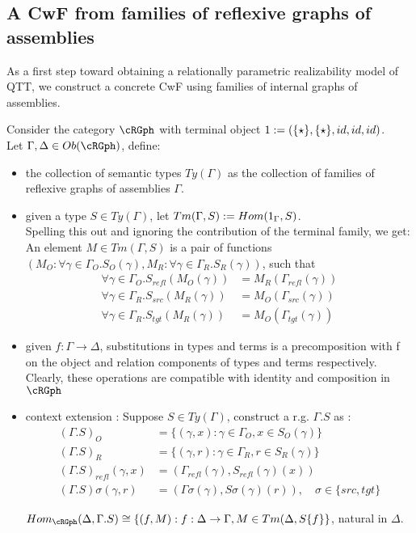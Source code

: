 \documentclass[12pt,a4paper]{article}
\def\src{_{src}}\alwaysmath{src}
\def\rfl{_{refl}}\alwaysmath{rfl}
\def\tgt{_{tgt}}\alwaysmath{tgt}
\renewcommand{\O}{_{O}}\alwaysmath{O}
\def\R{_{R}}\alwaysmath{R}
\begin{document}
\subsection*{A CwF from families of reflexive graphs of assemblies}
As a first step toward obtaining a relationally parametric realizability model of QTT, we construct a concrete CwF using families of internal graphs of assemblies.

Consider the category $\cRGph$ with terminal object $1 := (\{\star\}, \{\star\}, id, id, id)$.\\
Let $\Gamma, \Delta \in \ob\cRGph$, define: 
\begin{itemize}[noitemsep]
  \item the collection of semantic types $Ty(\Gamma)$ as the collection of families of reflexive graphs of assemblies $\Gamma$.
  
  \item given a type $S \in Ty(\Gamma)$, let $Tm(\Gamma, S) := Hom(1_\Gamma, S)$.\\
  Spelling this out and ignoring the contribution of the terminal family, we get:\\
  An element $M \in Tm(\Gamma, S)$ is a pair of functions $(M\O : \forall \gamma \in \Gamma\O. S\O(\gamma), M\R : \forall \gamma \in \Gamma\R. S\R(\gamma))$, such that 
  \begin{align*}
    \forall \gamma \in \Gamma\O. {S\rfl} (M\O(\gamma)) &= M\R(\Gamma\rfl(\gamma))\\
    \forall \gamma \in \Gamma\R. {S\src} (M\R(\gamma)) &= M\O(\Gamma\src(\gamma))\\
    \forall \gamma \in \Gamma\R. {S\tgt} (M\R(\gamma)) &= M\O(\Gamma\tgt(\gamma))
  \end{align*}
  
  \item given $f : \Gamma \to \Delta$, substitutions in types and terms is a precomposition with f on the object and relation components of types and terms respectively. Clearly, these operations are compatible with identity and composition in $\cRGph$
  
  \item context extension : Suppose $S \in Ty(\Gamma)$, construct a r.g. $\Gamma.S$ as :
  \begin{align*}
    (\Gamma.S)\O &= \{(\gamma, x) : \gamma \in \Gamma\O, x \in S\O(\gamma)\}\\
    (\Gamma.S)\R &= \{(\gamma, r) : \gamma \in \Gamma\R, r \in S\R(\gamma)\}\\
    (\Gamma.S)\rfl(\gamma, x) &= (\Gamma\rfl(\gamma), S\rfl(\gamma)(x))\\
    (\Gamma.S)\sigma(\gamma, r) &= (\Gamma\sigma(\gamma), S\sigma(\gamma)(r)),\quad \sigma \in \{src, tgt\}
  \end{align*}
  \begin{claim}
    $Hom_{\cRGph}(\Delta, \Gamma.S) \cong \{(f,M): f : \Delta \to \Gamma, M \in Tm(\Delta, S\{f\}\}$, natural in $\Delta$.
  \end{claim}
\end{itemize}
\end{document}
